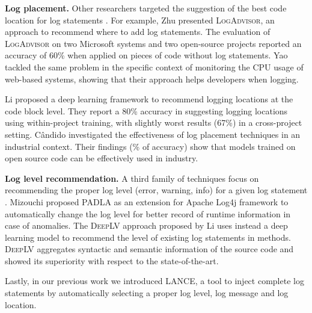 \textbf{Log placement.} Other researchers targeted the suggestion of the best code location for log statements \cite{jia2018smartlog,li2018studying,li2020towards}. For example, Zhu \etal \cite{zhu2015learning} presented \textsc{LogAdvisor}, an approach to recommend where to add log statements. The evaluation of \textsc{LogAdvisor} on two Microsoft systems and two open-source projects reported an accuracy of 60\% when applied on pieces of code without log statements.
Yao \etal \cite{yao2018log4perf} tackled the same problem in the specific context of monitoring the CPU usage of web-based systems, showing that their approach helps developers when logging.

Li \etal \cite{li2020shall} proposed a deep learning framework to recommend logging locations at the code block level. They report a 80\% accuracy in suggesting logging locations using within-project training, with slightly worst results (67\%) in a cross-project setting. C\^andido \etal \cite{candido2021exploratory} investigated the effectiveness of log placement techniques in an industrial context. Their findings (\% of accuracy) show that models trained on open source code can be effectively used in industry. \smallskip 

\textbf{Log level recommendation.} A third family of techniques focus on recommending the proper log level (\eg error, warning, info) for a given log statement \cite{yuan2012characterizing,oliner2012advances}. Mizouchi \etal \cite{mizouchi2019padla} proposed \textsc{PADLA} as an extension for Apache Log4j framework to automatically change the log level for better record of runtime information in case of anomalies. 
The \textsc{DeepLV} approach proposed by Li \etal \cite{li2021deeplv} uses instead a deep learning model to recommend the level of existing log statements in methods. \textsc{DeepLV} aggregates syntactic and semantic information of the source code and showed its superiority with respect to the state-of-the-art. 

Lastly, in our previous work \cite{mastropaolo2022using} we introduced \textsc{LANCE}, a tool to inject complete log statements by automatically selecting a proper log level, log message and log location. 

